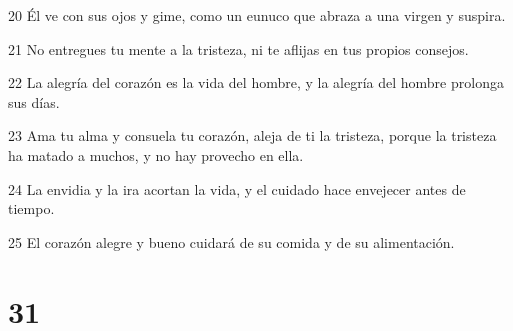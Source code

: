 \par 20 Él ve con sus ojos y gime, como un eunuco que abraza a una virgen y suspira.
\par 21 No entregues tu mente a la tristeza, ni te aflijas en tus propios consejos.
\par 22 La alegría del corazón es la vida del hombre, y la alegría del hombre prolonga sus días.
\par 23 Ama tu alma y consuela tu corazón, aleja de ti la tristeza, porque la tristeza ha matado a muchos, y no hay provecho en ella.
\par 24 La envidia y la ira acortan la vida, y el cuidado hace envejecer antes de tiempo.
\par 25 El corazón alegre y bueno cuidará de su comida y de su alimentación.

\chapter{31}

